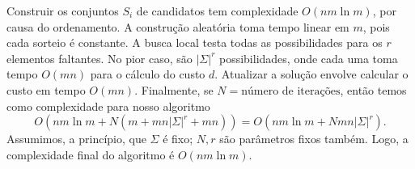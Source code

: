 Construir os conjuntos $S_i$ de candidatos tem complexidade $O(nm\ln m)$, por causa do ordenamento. A construção aleatória toma tempo linear em $m$, pois cada sorteio é constante. A busca local testa todas as possibilidades para os $r$ elementos faltantes. No pior caso, são $|\Sigma|^r$ possibilidades, onde cada uma toma tempo $O(mn)$ para o cálculo do custo $d$. Atualizar a solução envolve calcular o custo em tempo $O(mn)$. Finalmente, se $N = \text{número de iterações}$, então temos como complexidade para nosso algoritmo
\[O(nm\ln m + N(m + mn|\Sigma|^r + mn)) = O(nm\ln m + Nmn|\Sigma|^r).\]
Assumimos, a princípio, que $\Sigma$ é fixo; $N, r$ são parâmetros fixos também. Logo, a complexidade final do algoritmo é $O(nm\ln m)$.
